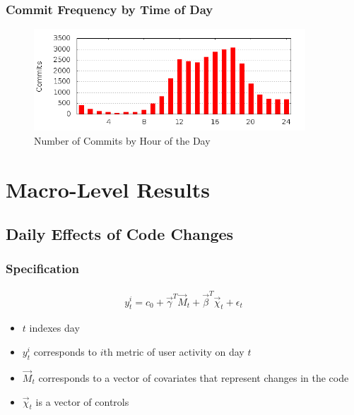 \documentclass[xcolor=pdftex,dvipsnames,table]{beamer}
\begin{document}
\frame
{
    \frametitle{Commit Frequency by Time of Day}
    \begin{figure}[h!]
    \centering
    \includegraphics[width=4in]{pictures/commit-hours.png}
    \caption{Number of Commits by Hour of the Day}
    \label{fig:commit-hours}
    \end{figure}

}

\section{Macro-Level Results}

\subsection{Daily Effects of Code Changes}

\frame
{
    \frametitle{Specification}
    \begin{eqnarray}
    y^i_{t} = c_0 + \vec{\gamma}^T \vec{M}_t + \vec{\beta}^T \vec{\chi}_t + \epsilon_t
    \end{eqnarray}

    \begin{itemize}
        \item $t$ indexes day
        \item $y^i_t$ corresponds to $i$th metric of user activity on day $t$
        \item $\vec{M}_t$ corresponds to a vector of covariates that represent changes in the code
        \item $\vec{\chi}_t$ is a vector of controls
    \end{itemize}
}   
\end{document}
